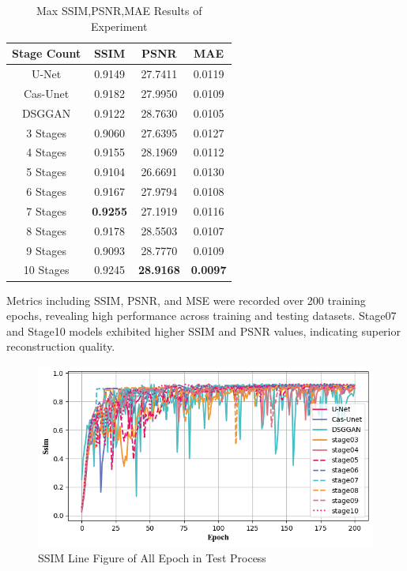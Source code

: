 \documentclass[twocolumn]{article}
\begin{document}
\begin{table}[h]
	\centering
	\caption{Max SSIM,PSNR,MAE Results of Experiment}
	\label{tab:exps_result}
	\begin{tabular}{cccc}
		\toprule
		Stage Count & SSIM            & PSNR             & MAE             \\
		\midrule
		U-Net       & 0.9149          & 27.7411          & 0.0119          \\
		Cas-Unet    & 0.9182          & 27.9950          & 0.0109          \\
		DSGGAN      & 0.9122          & 28.7630          & 0.0105          \\
		3 Stages    & 0.9060          & 27.6395          & 0.0127          \\
		4 Stages    & 0.9155          & 28.1969          & 0.0112          \\
		5 Stages    & 0.9104          & 26.6691          & 0.0130          \\
		6 Stages    & 0.9167          & 27.9794          & 0.0108          \\
		7 Stages    & \textbf{0.9255} & 27.1919          & 0.0116          \\
		8 Stages    & 0.9178          & 28.5503          & 0.0107          \\
		9 Stages    & 0.9093          & 28.7770          & 0.0109          \\
		10 Stages   & 0.9245          & \textbf{28.9168} & \textbf{0.0097} \\

		\bottomrule
	\end{tabular}
\end{table}

Metrics including SSIM, PSNR, and MSE were recorded over 200 training epochs, revealing high performance across training and testing datasets. Stage07 and Stage10 models exhibited higher SSIM and PSNR values, indicating superior reconstruction quality.

\begin{figure}[h]
	\centering
	\includegraphics[width=1.0\linewidth]{u-net/lung/csv_lung_13_csv_img_2025_04_07_01_44_03/ssim_comparison}
	\caption[ssim]{SSIM Line Figure of All Epoch in Test Process}
	\label{fig:ssim}
\end{figure}
\end{document}

